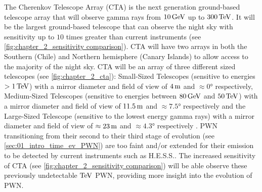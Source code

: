 The Cherenkov Telescope Array (CTA) is the next generation ground-based telescope array that will observe gamma rays from $10\,\si{\giga\electronvolt}$ up to $300\,\TeV$. It will be the largest ground-based telescope that can observe the night sky with sensitivity up to $10$ times greater than current instruments (see \autoref{fig:chapter_2_sensitivity comparison}). CTA will have two arrays in both the Southern (Chile) and Northern hemisphere (Canary Islands) to allow access to the majority of the night sky.
\newpar
CTA will be an array of three different sized telescopes (see \autoref{fig:chapter_2_cta}): Small-Sized Telescopes (sensitive to energies $>1\,\TeV$) with a mirror diameter and field of view of $4\,\si{\meter}$ and $\approx\ang{0}$ respectively, Medium-Sized Telescopes (sensitive to energies between $80\,\si{\giga\electronvolt}$ and $50\,\TeV$) with a mirror diameter and field of view of $11.5\,\si{\meter}$ and $\approx\ang{7.5}$ respectively and the Large-Sized Telescope (sensitive to the lowest energy gamma rays) with a mirror diameter and field of view of $\approx 23\,\si{\meter}$ and $\approx\ang{4.3}$ respectively \citep{cherenkov_telescope_array,2019scta.book.....C}.
\newpar
PWN transitioning from their second to their third stage of evolution (see \autoref{sec:01_intro_time_ev_PWN}) are too faint and/or extended for their emission to be detected by current instruments such as H.E.S.S.. The increased sensitivity of CTA (see \autoref{fig:chapter_2_sensitivity comparison}) will be able observe these previously undetectable $\TeV$ PWN, providing more insight into the evolution of PWN.
